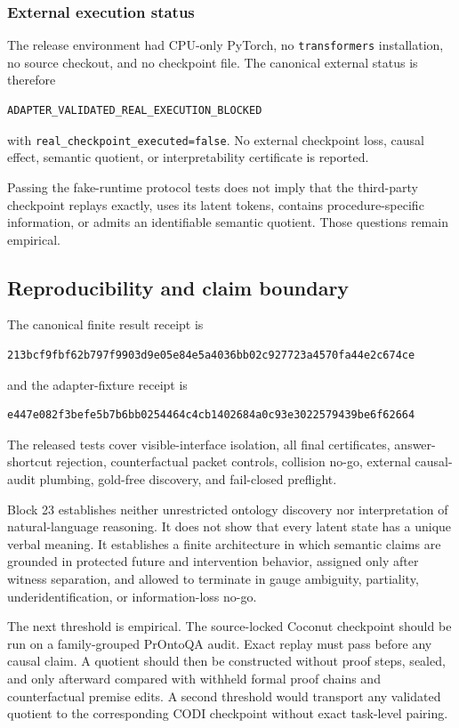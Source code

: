 \subsubsection{External execution status}

The release environment had CPU-only PyTorch, no \texttt{transformers} installation, no source checkout, and no checkpoint file.  The canonical external status is therefore
\begin{verbatim}
ADAPTER_VALIDATED_REAL_EXECUTION_BLOCKED
\end{verbatim}
with \texttt{real\_checkpoint\_executed=false}.  No external checkpoint loss, causal effect, semantic quotient, or interpretability certificate is reported.

\begin{warning}
Passing the fake-runtime protocol tests does not imply that the third-party checkpoint replays exactly, uses its latent tokens, contains procedure-specific information, or admits an identifiable semantic quotient.  Those questions remain empirical.
\end{warning}

\subsection{Reproducibility and claim boundary}

The canonical finite result receipt is
\begin{verbatim}
213bcf9fbf62b797f9903d9e05e84e5a4036bb02c927723a4570fa44e2c674ce
\end{verbatim}
and the adapter-fixture receipt is
\begin{verbatim}
e447e082f3befe5b7b6bb0254464c4cb1402684a0c93e3022579439be6f62664
\end{verbatim}
The released tests cover visible-interface isolation, all final certificates, answer-shortcut rejection, counterfactual packet controls, collision no-go, external causal-audit plumbing, gold-free discovery, and fail-closed preflight.

Block 23 establishes neither unrestricted ontology discovery nor interpretation of natural-language reasoning.  It does not show that every latent state has a unique verbal meaning.  It establishes a finite architecture in which semantic claims are grounded in protected future and intervention behavior, assigned only after witness separation, and allowed to terminate in gauge ambiguity, partiality, underidentification, or information-loss no-go.

The next threshold is empirical.  The source-locked Coconut checkpoint should be run on a family-grouped PrOntoQA audit.  Exact replay must pass before any causal claim.  A quotient should then be constructed without proof steps, sealed, and only afterward compared with withheld formal proof chains and counterfactual premise edits.  A second threshold would transport any validated quotient to the corresponding CODI checkpoint without exact task-level pairing.
